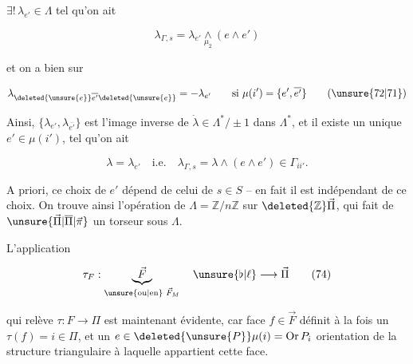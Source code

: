 
$\exists!\,\lambda_{e'}\in\Lambda$ tel qu'on ait

\[
\lambda_{\Gamma,s}=\lambda_{e'}\underset{\mu_2}{\wedge}(e\wedge e')\tag*{(71)}
\]

et on a bien sur

\[
\lambda_{\deleted{\unsure{e}}\overline{e'}\deleted{\unsure{e}}}=-\lambda_{e'}\qquad\text{si }\mu(i')=\{e',\overline{e'}\}\tag*{(\unsure{72|71})}
\]

Ainsi, $\{\lambda_{e'},\lambda_{\overline{e'}}\}$ est l'image inverse de $\dot\lambda\in\Lambda^*/\pm1$ dans $\Lambda^*$, et il existe un unique $e'\in\mu(i')$, tel qu'on ait

\[
\lambda=\lambda_{e'}\quad\text{i.e.}\quad\lambda_{\Gamma,s}=\lambda\wedge(e\wedge e')\in\Gamma_{ii'}.\tag*{(73)}
\]

A priori, ce choix de $e'$ dépend de celui de $s\in S$ -- en fait il est indépendant de ce choix. On trouve ainsi l'opération de $\Lambda=\mathbb Z/n\mathbb Z$ sur $\deleted{\mathbb Z}\vec\Pi$, qui fait de $\unsure{\vec\Pi|\overline\Pi|\vec\pi}$ un torseur sous $\Lambda$.

L'application

\[
\tau_F:\underbrace{\vec F}_{\text{\unsure{ou|en} }\vec F_M}\quad\unsure{\flat|\ell}\longrightarrow\vec\Pi\tag*{(74)}
\]

qui relève $\tau:F\longrightarrow\Pi$ est maintenant évidente, car  face  $f\in\vec F$ définit à la fois un $\tau(f)=i\in\Pi$, et un $e\in\deleted{\unsure{P}}\mu(i)=\operatorname{Or}P_i$ orientation de la structure triangulaire à laquelle appartient cette face.
